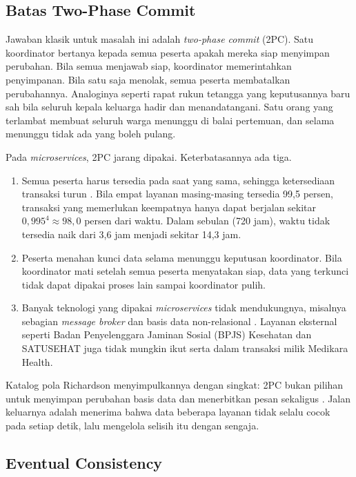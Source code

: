 \subsection{Batas Two-Phase Commit}

Jawaban klasik untuk masalah ini adalah \textit{two-phase commit} (2PC). Satu koordinator bertanya
kepada semua peserta apakah mereka siap menyimpan perubahan. Bila semua menjawab siap, koordinator
memerintahkan penyimpanan. Bila satu saja menolak, semua peserta membatalkan perubahannya.
Analoginya seperti rapat rukun tetangga yang keputusannya baru sah bila seluruh kepala keluarga
hadir dan menandatangani. Satu orang yang terlambat membuat seluruh warga menunggu di balai
pertemuan, dan selama menunggu tidak ada yang boleh pulang.

Pada \textit{microservices}, 2PC jarang dipakai. Keterbatasannya ada tiga.
\begin{enumerate}
  \item Semua peserta harus tersedia pada saat yang sama, sehingga ketersediaan transaksi turun
        \cite{richardson2018}. Bila empat layanan masing-masing tersedia 99,5 persen, transaksi yang
        memerlukan keempatnya hanya dapat berjalan sekitar $0{,}995^4 \approx 98{,}0$ persen dari
        waktu. Dalam sebulan (720 jam), waktu tidak tersedia naik dari 3,6 jam menjadi sekitar 14,3
        jam.
  \item Peserta menahan kunci data selama menunggu keputusan koordinator. Bila koordinator mati
        setelah semua peserta menyatakan siap, data yang terkunci tidak dapat dipakai proses lain
        sampai koordinator pulih.
  \item Banyak teknologi yang dipakai \textit{microservices} tidak mendukungnya, misalnya sebagian
        \textit{message broker} dan basis data non-relasional \cite{richardson2018}. Layanan
        eksternal seperti Badan Penyelenggara Jaminan Sosial (BPJS) Kesehatan dan SATUSEHAT juga
        tidak mungkin ikut serta dalam transaksi milik Medikara Health.
\end{enumerate}

Katalog pola Richardson menyimpulkannya dengan singkat: 2PC bukan pilihan untuk menyimpan perubahan
basis data dan menerbitkan pesan sekaligus \cite{c10-richardson-outbox}. Jalan keluarnya adalah
menerima bahwa data beberapa layanan tidak selalu cocok pada setiap detik, lalu mengelola selisih
itu dengan sengaja.

\subsection{Eventual Consistency}

